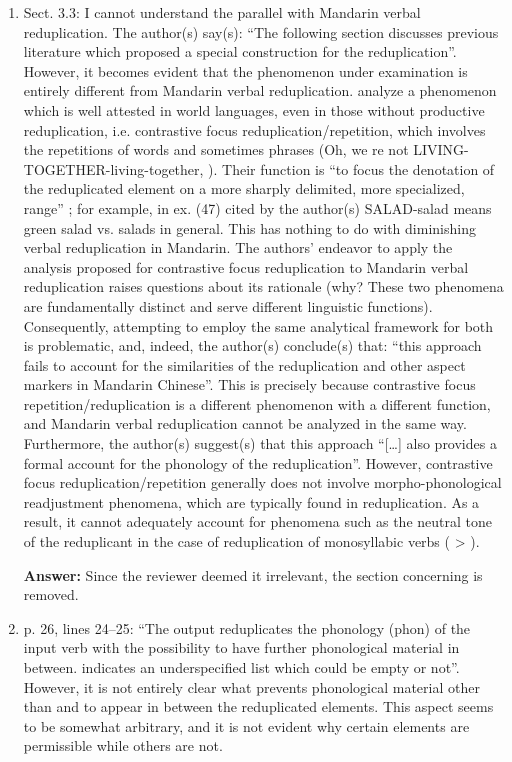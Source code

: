 \documentclass[fleqn,twoside]{article}
\begin{document}
\begin{enumerate}
\item
Sect. 3.3: I cannot understand the parallel with Mandarin verbal reduplication. The
author(s) say(s): ``The following section discusses previous literature which proposed a special
construction for the reduplication''. However, it becomes evident that the phenomenon under
examination is entirely different from Mandarin verbal reduplication. \citet{Ghomeshietal2004} analyze
a phenomenon which is well attested in world languages, even in those without productive
reduplication, i.e. contrastive focus reduplication/repetition, which involves the repetitions of
words and sometimes phrases (Oh, we re not LIVING-TOGETHER-living-together, \citealt[308]{Ghomeshietal2004}). Their function is “to focus the denotation of the reduplicated element on a more sharply delimited, more specialized, range” \citep[308]{Ghomeshietal2004}; for example, in ex. (47) cited by the author(s) SALAD-salad means green salad vs. salads in general. This has nothing to do with diminishing verbal reduplication in Mandarin. The authors' endeavor to apply the analysis proposed for contrastive focus reduplication to Mandarin verbal reduplication raises questions about its rationale (why? These two phenomena are fundamentally distinct and serve different linguistic functions). Consequently, attempting to employ the same analytical framework for both is problematic, and, indeed, the author(s) conclude(s) that: ``this approach fails to account for the similarities of the reduplication and other aspect markers in Mandarin Chinese''. This is precisely because contrastive focus repetition/reduplication is a different phenomenon with a different function, and Mandarin verbal reduplication cannot be analyzed in the same way. Furthermore, the author(s) suggest(s) that this approach ``[\ldots] also provides a formal account for the phonology of the reduplication''. However, contrastive focus reduplication/repetition generally does not involve morpho-phonological readjustment phenomena, which are typically found in reduplication. As a result, it cannot adequately account for phenomena such as the neutral tone of the reduplicant in the case of reduplication of monosyllabic verbs ( >  ).


\textbf{Answer:}
Since the reviewer deemed it irrelevant, the section concerning \citet{Ghomeshietal2004} is removed.

\item p. 26, lines 24--25: ``The output reduplicates the phonology (phon) of the input verb with the possibility to have further phonological material in between. \etag indicates an underspecified list which could be empty or not''. However, it is not entirely clear what prevents phonological material other than  and  to appear in between the reduplicated elements. This aspect seems to be somewhat arbitrary, and it is not evident why certain elements are permissible while others are not.


\end{enumerate}
\end{document}
